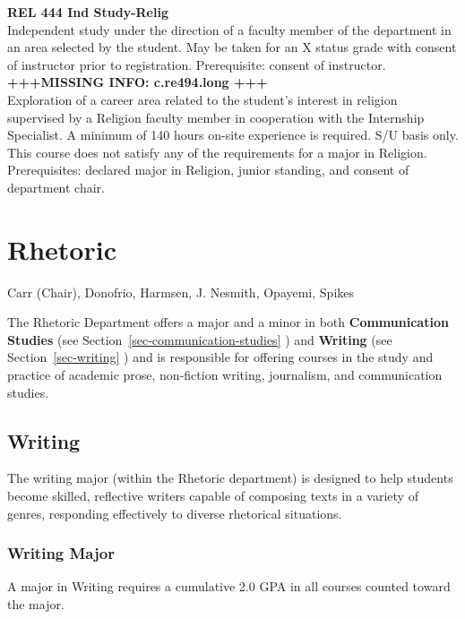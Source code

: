 \documentclass[
  letterpaper,
]{scrbook}
\begin{document}
\textbf{REL 444 Ind Study-Relig}\\
Independent study under the direction of a faculty member of the
department in an area selected by the student. May be taken for an X
status grade with consent of instructor prior to registration.
Prerequisite: consent of instructor.\\
\textbf{+++MISSING INFO: c.re494.long +++}\\
Exploration of a career area related to the student's interest in
religion supervised by a Religion faculty member in cooperation with the
Internship Specialist. A minimum of 140 hours on-site experience is
required. S/U basis only. This course does not satisfy any of the
requirements for a major in Religion. Prerequisites: declared major in
Religion, junior standing, and consent of department chair.

\section{Rhetoric}\label{sec-rhetoric}

Carr (Chair), Donofrio, Harmsen, J. Nesmith, Opayemi, Spikes

The Rhetoric Department offers a major and a minor in both
\textbf{Communication Studies} (see
Section~\ref{sec-communication-studies} ) and \textbf{Writing} (see
Section~\ref{sec-writing} ) and is responsible for offering courses in
the study and practice of academic prose, non-fiction writing,
journalism, and communication studies.

\subsection{Writing}\label{writing}

The writing major (within the Rhetoric department) is designed to help
students become skilled, reflective writers capable of composing texts
in a variety of genres, responding effectively to diverse rhetorical
situations.

\subsubsection{Writing Major}\label{writing-major}

A major in Writing requires a cumulative 2.0 GPA in all courses counted
toward the major.
\end{document}
